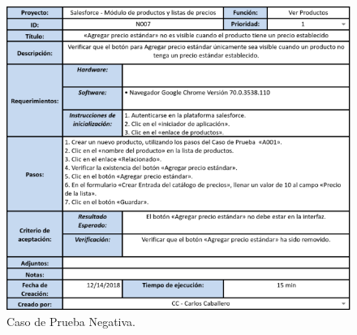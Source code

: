 \begin{figure}
\centering
\includegraphics[width=1.0\textwidth]{graphics/tc4-negative.eps}
\caption{Caso de Prueba Negativa.}
\label{tc_negative}
\end{figure}

